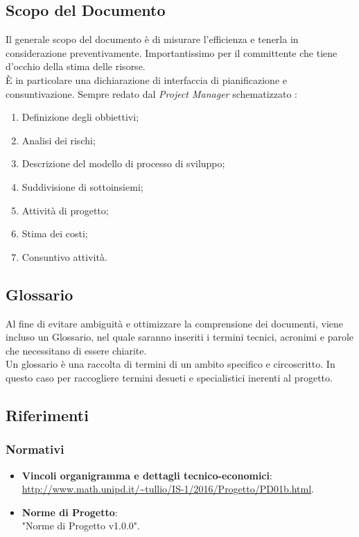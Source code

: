 \documentclass[12pt,a4paper,titlepage]{article}
\begin{document}
	\subsection{Scopo del Documento}
	Il generale scopo del documento è di misurare l'efficienza e tenerla in considerazione preventivamente. Importantissimo per il committente che tiene d'occhio della stima delle risorse. \\
	È in particolare una dichiarazione di interfaccia di pianificazione e consuntivazione. Sempre redato dal \textit{Project Manager} schematizzato :
	\begin{enumerate}
		\item Definizione degli obbiettivi;
		\item Analisi dei rischi;
		\item Descrizione del modello di processo di sviluppo;
		\item Suddivisione di sottoinsiemi;
		\item Attività di progetto;
		\item Stima dei costi;
		\item Consuntivo attività.
	\end{enumerate} 
	
	\subsection{Glossario}
	Al fine di evitare ambiguità e ottimizzare la comprensione dei documenti, viene incluso un Glossario, nel quale saranno inseriti i termini tecnici, acronimi e parole che necessitano di essere chiarite.\\
	Un glossario è una raccolta di termini di un ambito specifico e circoscritto. In questo caso per raccogliere termini desueti e specialistici inerenti al progetto. 
	
	\subsection{Riferimenti}
	\subsubsection{Normativi}
	\begin{itemize}
		\item \textbf{Vincoli organigramma e dettagli tecnico-economici}: \\
		\textcolor{blue}{\url{http://www.math.unipd.it/~tullio/IS-1/2016/Progetto/PD01b.html}}.
		\item \textbf{Norme di Progetto}: \\
		"Norme di Progetto v1.0.0".
	\end{itemize}
\end{document}
